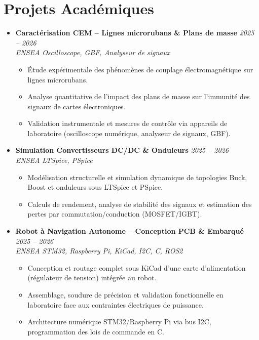 \documentclass[a4paper,11pt]{article}
\begin{document}
\section{Projets Académiques}
\begin{itemize}[leftmargin=*, label={-}]

\item \textbf{Caractérisation CEM -- Lignes microrubans \& Plans de masse} \hfill \textit{2025 -- 2026} \\
\textit{ENSEA} \hfill \textit{Oscilloscope, GBF, Analyseur de signaux}
\vspace{-2pt}
    \begin{itemize}[leftmargin=0.4cm, nosep, label=\tiny$\bullet$]
        \item \small{Étude expérimentale des phénomènes de couplage électromagnétique sur lignes microrubans.}
        \item \small{Analyse quantitative de l'impact des plans de masse sur l'immunité des signaux de cartes électroniques.}
        \item \small{Validation instrumentale et mesures de contrôle via appareils de laboratoire (oscilloscope numérique, analyseur de signaux, GBF).}
    \end{itemize}
\vspace{3pt}

\item \textbf{Simulation Convertisseurs DC/DC \& Onduleurs} \hfill \textit{2025 -- 2026} \\
\textit{ENSEA} \hfill \textit{LTSpice, PSpice}
\vspace{-2pt}
    \begin{itemize}[leftmargin=0.4cm, nosep, label=\tiny$\bullet$]
        \item \small{Modélisation structurelle et simulation dynamique de topologies Buck, Boost et onduleurs sous LTSpice et PSpice.}
        \item \small{Calculs de rendement, analyse de stabilité des signaux et estimation des pertes par commutation/conduction (MOSFET/IGBT).}
    \end{itemize}
\vspace{3pt}

\item \textbf{Robot à Navigation Autonome -- Conception PCB \& Embarqué} \hfill \textit{2025 -- 2026} \\
\textit{ENSEA} \hfill \textit{STM32, Raspberry Pi, KiCad, I2C, C, ROS2}
\vspace{-2pt}
    \begin{itemize}[leftmargin=0.4cm, nosep, label=\tiny$\bullet$]
        \item \small{Conception et routage complet sous KiCad d'une carte d'alimentation (régulateur de tension) intégrée au robot.}
        \item \small{Assemblage, soudure de précision et validation fonctionnelle en laboratoire face aux contraintes électriques de puissance.}
        \item \small{Architecture numérique STM32/Raspberry Pi via bus I2C, programmation des lois de commande en C.}
    \end{itemize}
\vspace{3pt}


\end{itemize}
\end{document}
